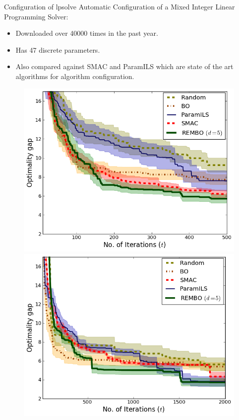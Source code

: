 \documentclass[final]{beamer}
\begin{document}
\begin{frame}[t]
\begin{columns}[T]
\begin{column}{.48\textwidth}
\begin{block}{Configuration of lpsolve}
Automatic Configuration of a Mixed Integer
Linear Programming Solver:
\begin{itemize}
   \item Downloaded over 40000 times in the past year.
   \item Has 47 discrete parameters.
   \item Also compared against SMAC and ParamILS which are state of the art algorithms
   for algorithm configuration.
  \end{itemize}
 \begin{figure}[h!]
\begin{center}
  \includegraphics[scale=0.8]{../paper/figures/lpsolve.png}
  \includegraphics[scale=0.8]{../paper/figures/lpsolve_interleave.png}

\end{center}
\end{figure}
\end{block}
\end{column}
\end{columns}
\end{frame}
\end{document}
